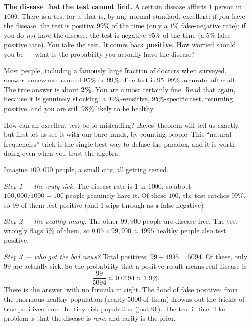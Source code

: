 \begin{paradoxbox}
\textbf{The disease that the test cannot find.} A certain disease afflicts $1$ person in
$1000$. There is a test for it that is, by any normal standard, excellent: if you have
the disease, the test is positive $99\%$ of the time (only a $1\%$ false-negative rate);
if you do \emph{not} have the disease, the test is negative $95\%$ of the time (a $5\%$
false-positive rate). You take the test. It comes back \textbf{positive}. How worried
should you be --- what is the probability you actually have the disease?

Most people, including a famously large fraction of doctors when surveyed, answer
somewhere around $95\%$ or $99\%$. The test is $95$--$99\%$ accurate, after all. The
true answer is about \textbf{2\%}. You are almost certainly fine. Read that again,
because it is genuinely shocking: a $99\%$-sensitive, $95\%$-specific test, returning
positive, and you are still $98\%$ likely to be healthy.
\end{paradoxbox}

How can an excellent test be so misleading? Bayes' theorem will tell us exactly, but
first let us see it with our bare hands, by counting people. This ``natural frequencies''
trick is the single best way to defuse the paradox, and it is worth doing even when you
trust the algebra.

\begin{walkbox}
Imagine $100{,}000$ people, a small city, all getting tested.

\emph{Step 1 --- the truly sick.} The disease rate is $1$ in $1000$, so about
$100{,}000 / 1000 = 100$ people genuinely have it. Of these $100$, the test catches
$99\%$, so $99$ of them test positive (and $1$ slips through as a false negative).

\emph{Step 2 --- the healthy many.} The other $99{,}900$ people are disease-free. The
test wrongly flags $5\%$ of them, so $0.05 \times 99{,}900 \approx 4995$ healthy people
also test positive.

\emph{Step 3 --- who got the bad news?} Total positives:
$99 + 4995 = 5094$. Of these, only $99$ are actually sick. So the probability that a
positive result means real disease is
\[
  \frac{99}{5094} \approx 0.0194 \approx 1.9\%.
\]
There is the answer, with no formula in sight. The flood of false positives from the
enormous healthy population (nearly $5000$ of them) drowns out the trickle of true
positives from the tiny sick population (just $99$). The test is fine. The problem is
that the disease is \emph{rare}, and rarity is the prior.
\end{walkbox}

